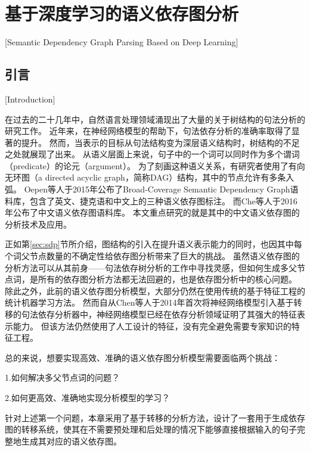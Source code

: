 
\chapter[基于深度学习的语义依存图分析]{基于深度学习的语义依存图分析}[Semantic Dependency Graph Parsing Based on Deep Learning]

\section{引言}[Introduction]

在过去的二十几年中，自然语言处理领域涌现出了大量的关于树结构的句法分析的研究工作\cite{eisner-1996-three, nivre-2004-incrementality, mcdonald-etal-2006-online, nivre-2009-non, zhang-nivre-2011-transition}。
近年来，在神经网络模型的帮助下，句法依存分析的准确率取得了显著的提升\cite{chen-manning-2014-fast,weiss-etal-2015-structured, andor-etal-2016-globally}。
然而，当表示的目标从句法结构变为深层语义结构时，树结构的不足之处就展现了出来。
从语义层面上来说，句子中的一个词可以同时作为多个谓词（predicate）的论元（argument）。
为了刻画这种语义关系，有研究者使用了有向无环图（a directed acyclic graph，简称DAG）结构，其中的节点允许有多条入弧。
Oepen等人\cite{oepen-etal-2015-semeval}于2015年公布了Broad-Coverage Semantic Dependency Graph语料库，包含了英文、捷克语和中文上的三种语义依存图标注。
而Che等人\cite{che-etal-2016-semeval}于2016年公布了中文语义依存图语料库。
本文重点研究的就是其中的中文语义依存图的分析技术及应用。

正如第\ref{sec:sdp}节所介绍，图结构的引入在提升语义表示能力的同时，也因其中每个词父节点数量的不确定性给依存图分析带来了巨大的挑战。
虽然语义依存图的分析方法可以从其前身——句法依存树分析的工作中寻找灵感，但如何生成多父节点词，是所有的依存图分析方法都无法回避的，也是依存图分析中的核心问题。
除此之外，此前的语义依存图分析模型，大部分仍然在使用传统的基于特征工程的统计机器学习方法。
然而自从Chen等人\cite{chen-manning-2014-fast}于2014年首次将神经网络模型引入基于转移的句法依存分析器中，神经网络模型已经在依存分析领域证明了其强大的特征表示能力。
但该方法仍然使用了人工设计的特征，没有完全避免需要专家知识的特征工程。

总的来说，想要实现高效、准确的语义依存图分析模型需要面临两个挑战：

1.如何解决多父节点词的问题？

2.如何更高效、准确地实现分析模型的学习？

针对上述第一个问题，本章采用了基于转移的分析方法，设计了一套用于生成依存图的转移系统，使其在不需要预处理和后处理的情况下能够直接根据输入的句子完整地生成其对应的语义依存图。

